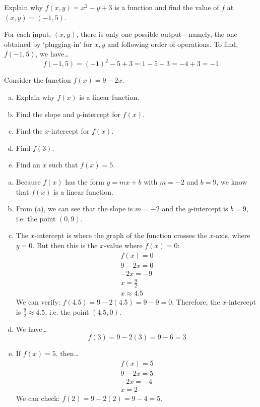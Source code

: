 \documentclass[12pt,letterpaper]{exam}
\begin{document}
\begin{questions}
\newpage
\question[10] Explain why $f(x, y)= x^2 - y + 3$ is a function and find the value of $f$ at $(x, y)= (-1, 5)$. \pspace

\sol For each input, $(x, y)$, there is only one possible output---namely, the one obtained by `plugging-in' for $x, y$ and following order of operations. To find, $f(-1, 5)$, we have\dots
	\[
	f(-1, 5)= (-1)^2 - 5 + 3= 1 - 5 + 3= -4 + 3= -1
	\]



\newpage
\question[10] Consider the function $f(x)= 9 - 2x$. 
	\begin{enumerate}[(a)]
	\item Explain why $f(x)$ is a linear function. 
	\item Find the slope and $y$-intercept for $f(x)$. 
	\item Find the $x$-intercept for $f(x)$. 
	\item Find $f(3)$. 
	\item Find an $x$ such that $f(x)= 5$. 
	\end{enumerate} \pspace

\sol  
\begin{enumerate}[(a)]
\item Because $f(x)$ has the form $y= mx + b$ with $m= -2$ and $b= 9$, we know that $f(x)$ is a linear function. \pspace

\item From (a), we can see that the slope is $m= -2$ and the $y$-intercept is $b= 9$, i.e. the point $(0, 9)$. \pspace

\item The $x$-intercept is where the graph of the function crosses the $x$-axis, where $y= 0$. But then this is the $x$-value where $f(x)= 0$:
	\[
	\begin{gathered}
	f(x)= 0 \\
	9 - 2x= 0 \\
	-2x= -9 \\
	x= \frac{9}{2} \\
	x \approx 4.5
	\end{gathered}
	\]
We can verify: $f(4.5)= 9 - 2(4.5)= 9 - 9= 0$. Therefore, the $x$-intercept is $\frac{9}{2} \approx 4.5$, i.e. the point $(4.5, 0)$. \pspace

\item We have\dots
	\[
	f(3)= 9 - 2(3)= 9 - 6= 3
	\] \pspace

\item If $f(x)= 5$, then\dots
	\[
	\begin{gathered}
	f(x)= 5 \\
	9 - 2x= 5 \\
	-2x= -4 \\
	x= 2
	\end{gathered}
	\]
We can check: $f(2)= 9 - 2(2)= 9 - 4= 5$. 
\end{enumerate}
	



\end{questions}
\end{document}
